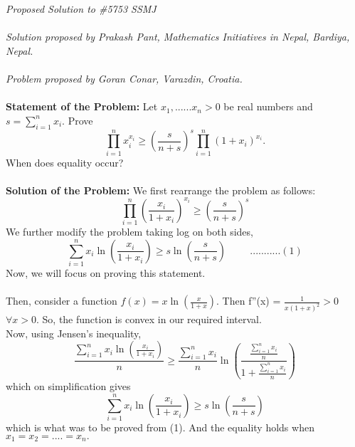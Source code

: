 \documentclass[12pt]{article}
\begin{document}
\textit{Proposed Solution to \#5753 SSMJ }\\ \\
\textit{Solution proposed by Prakash Pant, Mathematics Initiatives in Nepal, Bardiya, Nepal.}\\ \\
\textit{Problem proposed by Goran Conar, Varazdin, Croatia.} \\ \\
\textbf{Statement of the Problem:}
 Let $x_1,......x_n >0 $  be real numbers and $s = \sum_{i=1}^{n} x_i $. Prove \\
\[ \prod_{i=1}^{n} x_i^{x_i} \ge  (\frac{s}{n+s})^s \prod_{i=1}^{n} {(1+x_i)}^{x_i}.	\]
When does equality occur? \\ \\ 

\textbf{Solution of the Problem:}
We first rearrange the problem as follows:\\
\[ \prod_{i=1}^{n} (\frac{x_i}{1+x_i})^{x_i}\ge  (\frac{s}{n+s})^s  					\]
We further modify the problem taking log on both sides, \\
\[ \sum_{i=1}^{n} x_i \ln(\frac{x_i}{1+x_i})	\ge s \ln(\frac{s}{n+s}) \hspace{1cm} ...........(1)				\]
Now, we will focus on proving this statement. \\ \\ 
Then, consider a function $ f(x) = x \ln (\frac{x}{1+x})$. Then f''(x) = $\frac{1}{x(1+x)^2}>0$ $\forall x>0 $. So, the function is convex in our required interval. \\
Now, using Jensen's inequality,\\
\[	\frac{\sum_{i=1}^{n} x_i \ln(\frac{x_i}{1+x_i})}{n}	\ge \frac{\sum_{i=1}^{n} x_i}{n} 
\ln(\frac{ \frac{\sum_{i=1}^{n} x_i}{n}}{1 + \frac{\sum_{i=1}^{n} x_i}{n}} )						\]		
which on simplification gives
\[	\sum_{i=1}^{n} x_i \ln(\frac{x_i}{1+x_i})\ge s
\ln(\frac{s}{n+s} )						\]	
which is what was to be proved from (1). And the equality holds when $ x_1 = x_2 = ....=x_n .$
					
\end{document}
